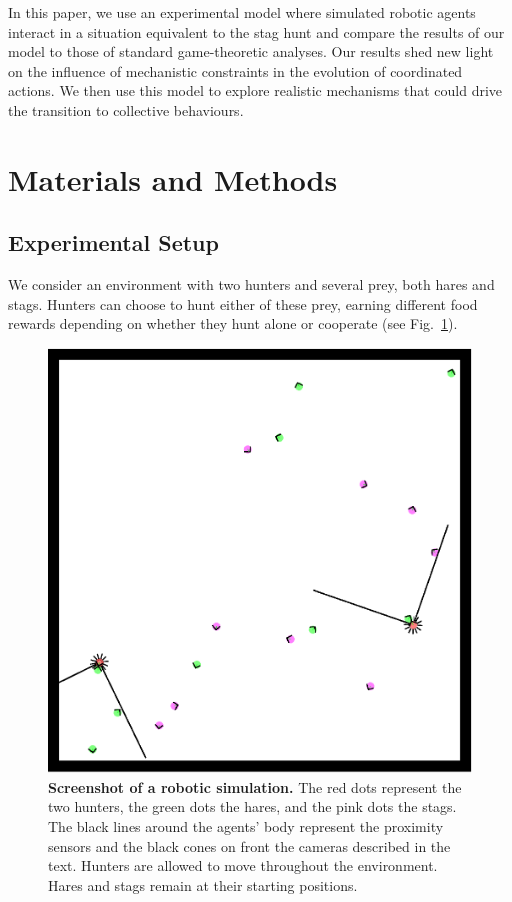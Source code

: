   In this paper, we use an experimental model where simulated robotic agents interact in a situation equivalent to the stag hunt and compare the results of our model to those of standard game-theoretic analyses. Our results shed new light on the influence of mechanistic constraints in the evolution of coordinated actions. We then use this model to explore realistic mechanisms that could drive the transition to collective behaviours.


\section{Materials and Methods}
\label{sec:methods}
  \subsection{Experimental Setup}
  \label{setup}
    We consider an environment with two hunters and several prey, both hares and stags. Hunters can choose to hunt either of these prey, earning different food rewards depending on whether they hunt alone or cooperate (see Fig.~\ref{fig:figureSimulation}).

    \begin{figure}[h]
      \centering
        \includegraphics[scale = 0.60]{fig/ArticleBio1/Fig1.eps}
      \caption{\textbf{Screenshot of a robotic simulation.} 
      The red dots represent the two hunters, the green dots the hares, and the pink dots the stags. The black lines around the agents' body represent the proximity sensors and the black cones on front the cameras described in the text. Hunters are allowed to move throughout the environment. Hares and stags remain at their starting positions.}
      \label{fig:figureSimulation}
    \end{figure}

